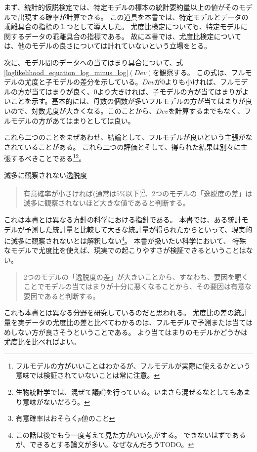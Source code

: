 まず、統計的仮説検定では、特定モデルの標本の統計要約量以上の値がそのモデルで出現する確率が計算できる。
この道具を本書では、特定モデルとデータの乖離具合の指標の１つとして導入した。
尤度比検定についても、特定モデルに関するデータの乖離具合の指標である。
故に本書では、尤度比検定については、他のモデルの良さについては計れていないという立場をとる。

次に、モデル間のデータへの当てはまり具合について、式\ref{loglikelihood_equation_log_minus_log}$(Dev)$を観察する。
この式は、フルモデルの尤度と子モデルの差分を示している。$Dev$が$0$よりも小ければ、フルモデルの方が当てはまりが良く、$0$より大きければ、子モデルの方が当てはまりがよいことを示す。基本的には、母数の個数が多いフルモデルの方が当てはまりが良いので、対数尤度が大きくなる。このことから、$Dev$を計算するまでもなく、フルモデルの方があてはまりとしては良い。

これら二つのことをまぜあわせ、結論として、フルモデルが良いという主張がなされていることがある。
これら二つの評価とそして、得られた結果は別々に主張するべきことである\footnote{フルモデルの方がいいことはわかるが、フルモデルが実際に使えるかという意味では検証されていないことは常に注意。}\footnote{生物統計学では、混ぜて議論を行っている。いまさら混ぜるなとしてもあまり意味がないだろう。}。


\begin{SMbox}{滅多に観察されない逸脱度}
\begin{quote}
 有意確率が小さければ(通常は$5\%$以下)\footnote{有意確率はおそらく$p$値のこと}、2つのモデルの「逸脱度の差」は滅多に観察されないほど大きな値であると判断する。
\end{quote}
    これは本書とは異なる方針の科学における指針である。 本書では、ある統計モデルが予測した統計量と比較して大きな統計量が得られたからといって、現実的に滅多に観察されないとは解釈しない\footnote{
        この話は後でもう一度考えて見た方がいい気がする。
        できないはずであるが、できるとする論文が多い。なぜなんだろうTODO。
    }。
 本書が扱いたい科学において、 特殊なモデルで尤度比を使えば、現実での起こりやすさが検証できるということはない。

 \begin{quote} 2つのモデルの「逸脱度の差」が大きいことから、すなわち、要因を覗くことでモデルの当てはまりが十分に悪くなることから、その要因は有意な要因であると判断する。
 \end{quote}
    これも本書とは異なる分野を研究しているのだと思われる。 尤度比の差の統計量を実データの尤度比の差と比べてわかるのは、フルモデルで予測または当てはめしない方が良さそうということである。
    より当てはまりのモデルかどうかは尤度比を比べればよい。
\end{SMbox}




